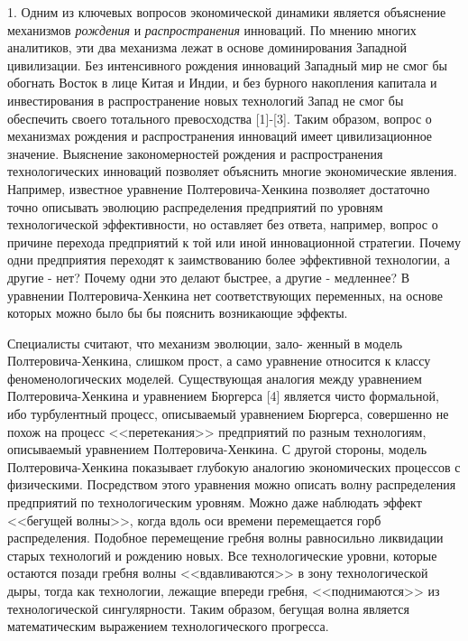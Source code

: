 


\vzmscaption

1. Одним из ключевых вопросов экономической динамики является
объяснение механизмов {\em рождения} и {\em распространения}
инноваций. По мнению многих аналитиков, эти два механизма лежат в
основе доминирования Западной цивилизации. Без интенсивного рождения
инноваций Западный мир не смог бы обогнать Восток в лице Китая и
Индии, и без бурного накопления капитала и инвестирования в
распространение новых технологий Запад не смог бы обеспечить своего
тотального превосходства [1]-[3]. Таким образом, вопрос о механизмах
рождения и распространения инноваций имеет цивилизационное значение.
Выяснение закономерностей рождения и распространения технологических
инноваций позволяет объяснить многие экономические явления.
Например, известное уравнение Пол\-те\-ро\-ви\-ча-Хен\-ки\-на
позволяет достаточно точно описывать эволюцию распределения
предприятий по уровням технологической эффективности, но оставляет
без ответа, например, вопрос о причине перехода предприятий к той
или иной инновационной стратегии. Почему одни предприятия переходят
к заимствованию более эффективной технологии, а другие - нет? Почему
одни это делают быстрее, а другие - медленнее? В уравнении
Полте\-ро\-ви\-ча-Хен\-ки\-на нет соответствующих переменных, на
основе которых можно было бы бы пояснить возникающие эффекты.

Специалисты считают, что механизм эволюции, зало-
\linebreak
женный в модель
Полтеровича-Хенкина, слишком прост, а само уравнение относится к
классу феноменологических моделей. Существующая аналогия между
уравнением Пол\-те\-ро\-ви\-ча-Хен\-ки\-на и уравнением Бюргерса [4]
является чисто формальной, ибо турбулентный процесс, описываемый
уравнением Бюргерса, совершенно не похож на процесс <<перетекания>>
предприятий по разным технологиям, описываемый уравнением
Полтеровича-Хенкина. С другой стороны, модель
Полтеровича-Хен\-ки\-на показывает глубокую аналогию экономических
процессов с физическими. Посредством этого уравнения можно описать
волну распределения предприятий по технологическим уровням. Можно
даже наблюдать эффект <<бегущей волны>>, когда вдоль оси времени
перемещается горб распределения. Подобное перемещение гребня волны
равносильно ликвидации старых технологий и рождению новых. Все
технологические уровни, которые остаются позади гребня волны
<<вдавливаются>> в зону технологической дыры, тогда как технологии,
лежащие впереди гребня, <<поднимаются>> из технологической
сингулярности. Таким образом, бегущая волна является математическим
выражением технологического прогресса.

